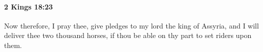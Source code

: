 
		\paragraph{2 Kings 18:23} %
			\label{2KINGS-18-23}

			Now therefore, I pray thee, give pledges to my lord the king of Assyria, and I will deliver thee two thousand horses, if thou be able on thy part to set riders upon them.


